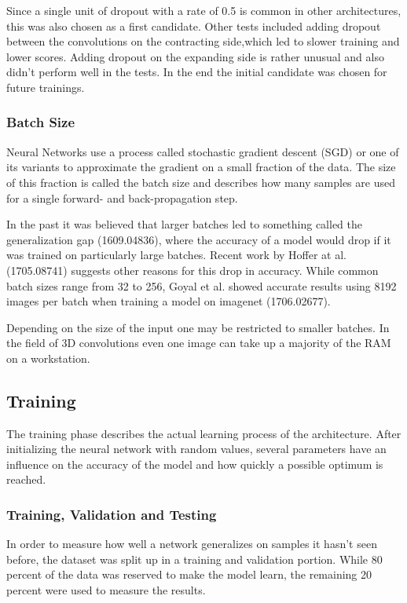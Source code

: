 Since a single unit of dropout with a rate of 0.5 is common in other architectures, this was also chosen as a first candidate. Other tests included adding dropout between the convolutions on the contracting side,which led to slower training and lower scores. Adding dropout on the expanding side is rather unusual and also didn't perform well in the tests. In the end the initial candidate was chosen for future trainings.

\subsubsection{Batch Size}

Neural Networks use a process called stochastic gradient descent (SGD) or one of its variants to approximate the gradient on a small fraction of the data. The size of this fraction is called the batch size and describes how many samples are used for a single forward- and back-propagation step.

In the past it was believed that larger batches led to something called the generalization gap (1609.04836), where the accuracy of a model would drop if it was trained on particularly large batches. Recent work by Hoffer at al. (1705.08741) suggests other reasons for this drop in accuracy. While common batch sizes range from 32 to 256, Goyal et al. showed accurate results using 8192 images per batch when training a model on imagenet (1706.02677).

Depending on the size of the input one may be restricted to smaller batches. In the field of 3D convolutions even one image can take up a majority of the RAM on a workstation.

\subsection{Training}

The training phase describes the actual learning process of the architecture. After initializing the neural network with random values, several parameters have an influence on the accuracy of the model and how quickly a possible optimum is reached.

\subsubsection{Training, Validation and Testing}

In order to measure how well a network generalizes on samples it hasn't seen before, the dataset was split up in a training and validation portion. While 80 percent of the data was reserved to make the model learn, the remaining 20 percent were used to measure the results.

